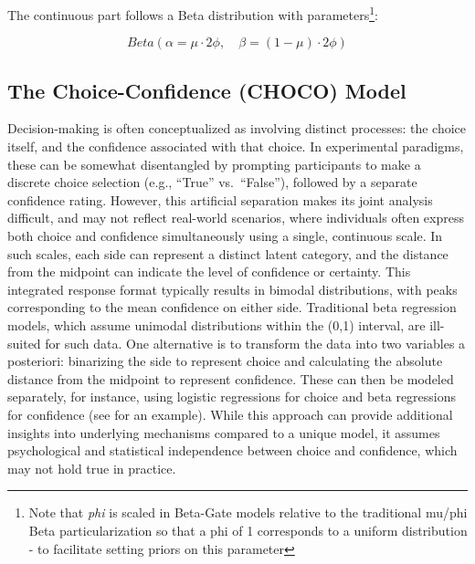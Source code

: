 \documentclass[
  jou,
  floatsintext,
  longtable,
  nolmodern,
  notxfonts,
  notimes,
  colorlinks=true,linkcolor=blue,citecolor=blue,urlcolor=blue]{apa7}
\begin{document}
The continuous part follows a Beta distribution with
parameters\footnote{Note that \emph{phi} is scaled in Beta-Gate models
  relative to the traditional mu/phi Beta particularization so that a
  phi of 1 corresponds to a uniform distribution - to facilitate setting
  priors on this parameter}:

\[
Beta(\alpha = \mu \cdot 2 \phi, \quad \beta = (1 - \mu) \cdot 2 \phi)
\]

\subsection{The Choice-Confidence (CHOCO)
Model}\label{the-choice-confidence-choco-model}

Decision-making is often conceptualized as involving distinct processes:
the choice itself, and the confidence associated with that choice. In
experimental paradigms, these can be somewhat disentangled by prompting
participants to make a discrete choice selection (e.g., ``True''
vs.~``False''), followed by a separate confidence rating. However, this
artificial separation makes its joint analysis difficult, and may not
reflect real-world scenarios, where individuals often express both
choice and confidence simultaneously using a single, continuous scale.
In such scales, each side can represent a distinct latent category, and
the distance from the midpoint can indicate the level of confidence or
certainty. This integrated response format typically results in bimodal
distributions, with peaks corresponding to the mean confidence on either
side. Traditional beta regression models, which assume unimodal
distributions within the (0,1) interval, are ill-suited for such data.
One alternative is to transform the data into two variables a
posteriori: binarizing the side to represent choice and calculating the
absolute distance from the midpoint to represent confidence. These can
then be modeled separately, for instance, using logistic regressions for
choice and beta regressions for confidence (see
 for an
example). While this approach can provide additional insights into
underlying mechanisms compared to a unique model, it assumes
psychological and statistical independence between choice and
confidence, which may not hold true in practice.
\end{document}
